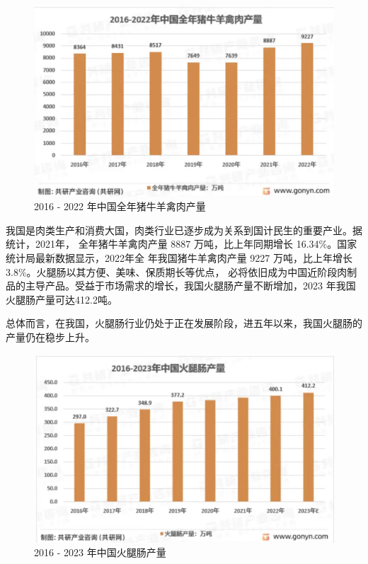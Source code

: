 \documentclass[UTF8]{ctexart}
\begin{document}
	\begin{figure}[htb]
		\centering
		\includegraphics[scale=0.8]{img/amount.png}
		\caption{2016 - 2022 年中国全年猪牛羊禽肉产量}
	\end{figure}

	我国是肉类生产和消费大国，肉类行业已逐步成为关系到国计民生的重要产业。据统计，2021年，
	全年猪牛羊禽肉产量 8887 万吨，比上年同期增长 16.34\%。国家统计局最新数据显示，2022年全
	年我国猪牛羊禽肉产量 9227 万吨，比上年增长 3.8\%。火腿肠以其方便、美味、保质期长等优点，
	必将依旧成为中国近阶段肉制品的主导产品。受益于市场需求的增长，我国火腿肠产量不断增加，2023
	年我国火腿肠产量可达412.2吨。

	总体而言，在我国，火腿肠行业仍处于正在发展阶段，进五年以来，我国火腿肠的产量仍在稳步上升。
	
	\begin{figure}[htb]
		\centering
		\includegraphics[scale=0.8]{img/sus_amount.png}
		\caption{2016 - 2023 年中国火腿肠产量}
	\end{figure}
\end{document}
